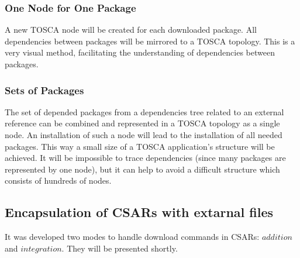 \subsubsection*{One Node for One Package}
A new TOSCA node will be created for each downloaded package. 
All dependencies between packages will be mirrored to a TOSCA topology.
This is a very visual method, facilitating the understanding of dependencies between packages.
\subsubsection*{Sets of Packages} \label{mode:setsofpkg}
The set of depended packages from a dependencies tree related to an external reference can be combined and represented in a TOSCA topology as a single node.
An installation of such a node will lead to the installation of all needed packages.
This way a small size of a TOSCA application's structure will be achieved.
It will be impossible to trace dependencies (since many packages are represented by one node), but it can help to avoid a difficult structure which consists of hundreds of nodes. 

\subsection{Encapsulation of CSARs with extarnal files}
It was developed two modes to handle download commands in CSARs: $addition$ and $integration$.
They will be presented shortly.

